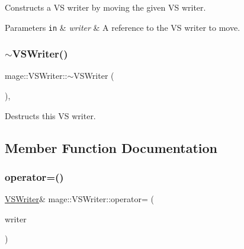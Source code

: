 Constructs a VS writer by moving the given VS writer.


\begin{DoxyParams}[1]{Parameters}
\mbox{\tt in}  & {\em writer} & A reference to the VS writer to move. \\
\hline
\end{DoxyParams}
\hypertarget{classmage_1_1_v_s_writer_aa15508560fbef2ef742beb1ff0d96d19}{}\label{classmage_1_1_v_s_writer_aa15508560fbef2ef742beb1ff0d96d19} 
\subsubsection{\texorpdfstring{$\sim$\+V\+S\+Writer()}{~VSWriter()}}
{\footnotesize\ttfamily mage\+::\+V\+S\+Writer\+::$\sim$\+V\+S\+Writer (\begin{DoxyParamCaption}{ }\end{DoxyParamCaption})\hspace{0.3cm}{\ttfamily [virtual]}, {\ttfamily [default]}}

Destructs this VS writer. 

\subsection{Member Function Documentation}
\hypertarget{classmage_1_1_v_s_writer_af943d317ae357723a08b2bbf2bab23ba}{}\label{classmage_1_1_v_s_writer_af943d317ae357723a08b2bbf2bab23ba} 
\subsubsection{\texorpdfstring{operator=()}{operator=()}\hspace{0.1cm}{\footnotesize\ttfamily [1/2]}}
{\footnotesize\ttfamily \hyperlink{classmage_1_1_v_s_writer}{V\+S\+Writer}\& mage\+::\+V\+S\+Writer\+::operator= (\begin{DoxyParamCaption}\item[{const \hyperlink{classmage_1_1_v_s_writer}{V\+S\+Writer} \&}]{writer }\end{DoxyParamCaption})\hspace{0.3cm}{\ttfamily [delete]}}

